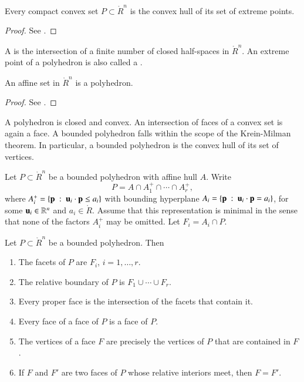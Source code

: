 \begin{lemma} Every compact
convex set $P\subset\ring{R}^n$ is the convex hull of its set of
extreme points.
\end{lemma}

\begin{proof}  See \cite[Theorem~2.6.16]{webster:1994}.
\end{proof}


\begin{definition} A  is the
intersection of a finite number of closed half-spaces in
$\ring{R}^n$.  An extreme point of a polyhedron is also called a
.
\end{definition}
%

\begin{lemma}\label{lemma:aff-poly}
An affine set in $\ring{R}^n$ is a polyhedron.
\end{lemma}

\begin{proof} See \cite[Cor~1.4.2]{webster:1994}.
\end{proof}

A polyhedron is closed and convex.  An intersection of faces of a
convex set is again a face.  A bounded polyhedron falls within the
scope of the Krein-Milman theorem.  In particular, a bounded
polyhedron is the convex hull of its set of vertices.
%

Let $P\subset\ring{R}^n$ be a bounded polyhedron with affine hull
$A$. Write
\begin{displaymath}
P = A \cap A^+_1 \cap \cdots \cap A^+_r,
\end{displaymath}
where $A^+_i = \{{\mathbf p}\ :\  {\mathbf u}_i\cdot {\mathbf p} \le a_i\}$ with bounding
hyperplane $A_i=\{{\mathbf p}\ :\  {\mathbf u}_i \cdot {\mathbf p} = a_i\}$, for some ${\mathbf u}_i\in
\mathbb{R}^n$ and $a_i\in\ring{R}$.  Assume that this representation is
minimal in the sense that none of the factors $A^+_i$ may be omitted.
Let $F_i = A_i\cap P$.  %


\begin{lemma}\label{lemma:webster}  
Let $P\subset\ring{R}^n$ be a bounded polyhedron.  Then
%
\begin{enumerate}
\item The facets of $P$ are $F_i$, $i=1,\ldots,r$.
\item The relative boundary of $P$ is $F_1\cup\cdots \cup F_r$.
\item Every proper face is the intersection of the facets that contain it.
\item Every face of a face of $P$ is a face of $P$.
\item The vertices of a face $F$ are precisely the vertices of $P$
that are contained in $F$.
\item If $F$ and $F'$ are two faces of $P$ whose relative interiors
meet, then $F=F'$.
\end{enumerate}
\end{lemma}
%
%
%

